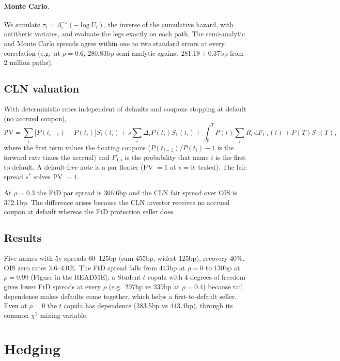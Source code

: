 \documentclass[11pt,a4paper]{article}
\begin{document}
\paragraph{Monte Carlo.} We simulate $\tau_i=\Lambda_i^{-1}(-\log U_i)$, the inverse of the cumulative
hazard, with antithetic variates, and evaluate the legs exactly on each path. The semi-analytic and
Monte Carlo spreads agree within one to two standard errors at every correlation (e.g.\ at $\rho=0.6$,
280.83bp semi-analytic against $281.19\pm0.37$bp from 2 million paths).

\subsection{CLN valuation}
With deterministic rates independent of defaults and coupons stopping at default (no accrued coupon),
\[
\mathrm{PV}=\sum_i\big[P(t_{i-1})-P(t_i)\big]S_1(t_i)+s\sum_i\Delta_iP(t_i)S_1(t_i)
+\int_0^TP(t)\sum_iR_i\,\mathrm dF_{1,i}(t)+P(T)S_1(T),
\]
where the first term values the floating coupons ($P(t_{i-1})/P(t_i)-1$ is the forward rate times
the accrual) and $F_{1,i}$ is the probability that name $i$ is the first to default. A default-free note
is a par floater (PV $=1$ at $s=0$; tested). The fair spread $s^*$ solves PV $=1$.
\begin{observation}
At $\rho=0.3$ the FtD par spread is 366.6bp and the CLN fair spread over OIS is 372.1bp. The difference
arises because the CLN investor receives no accrued coupon at default whereas the FtD protection seller does.
\end{observation}

\subsection{Results}
Five names with 5y spreads 60--125bp (sum 455bp, widest 125bp), recovery 40\%, OIS zero rates 3.6--4.0\%.
The FtD spread falls from 443bp at $\rho=0$ to 130bp at $\rho=0.99$ (Figure in the README); a Student-$t$
copula with 4 degrees of freedom gives lower FtD spreads at every $\rho$ (e.g.\ 297bp vs 339bp at $\rho=0.4$)
because tail dependence makes defaults come together, which helps a first-to-default seller. Even at
$\rho=0$ the $t$ copula has dependence (383.5bp vs 443.4bp), through its common $\chi^2$ mixing variable.

\section{Hedging}
\end{document}
